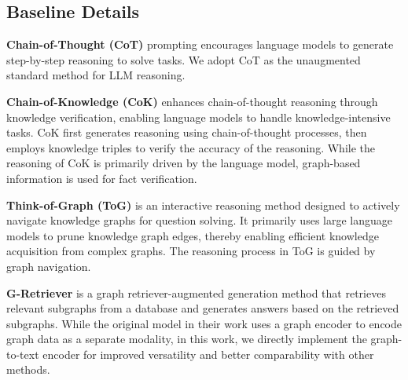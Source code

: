 

\subsection{Baseline Details} \label{appendix baseline}

\textbf{Chain-of-Thought (CoT)} \citep{wei2022chain,kojima2022large} prompting encourages language models to generate step-by-step reasoning to solve tasks. We adopt CoT as the unaugmented standard method for LLM reasoning.

\textbf{Chain-of-Knowledge (CoK)} \citep{li2023chain} enhances chain-of-thought reasoning through knowledge verification, enabling language models to handle knowledge-intensive tasks. CoK first generates reasoning using chain-of-thought processes, then employs knowledge triples to verify the accuracy of the reasoning. While the reasoning of CoK is primarily driven by the language model, graph-based information is used for fact verification.

\textbf{Think-of-Graph (ToG)} \citep{sun2023think} is an interactive reasoning method designed to actively navigate knowledge graphs for question solving. It primarily uses large language models to prune knowledge graph edges, thereby enabling efficient knowledge acquisition from complex graphs. The reasoning process in ToG is guided by graph navigation.

\textbf{G-Retriever} \citep{he2024g} is a graph retriever-augmented generation method that retrieves relevant subgraphs from a database and generates answers based on the retrieved subgraphs. While the original model in their work uses a graph encoder to encode graph data as a separate modality, in this work, we directly implement the graph-to-text encoder for improved versatility and better comparability with other methods.



